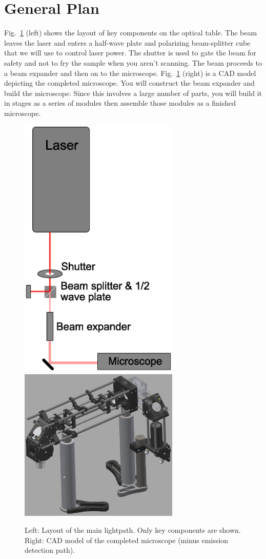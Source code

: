 \documentclass[a4paper]{report}
\begin{document}
\section{General Plan}
Fig.~\ref{fig:layout} (left) shows the layout of key components on the optical table. 
The beam leaves the laser and enters a half-wave plate and polarizing beam-splitter cube that we will use to control laser power. 
The shutter is used to gate the beam for safety and not to fry the sample when you aren't scanning.
The beam proceeds to a beam expander and then on to the microscope. 
Fig.~\ref{fig:layout} (right) is a CAD model depicting the completed microscope. 
You will construct the beam expander and build the microscope. 
Since this involves a large number of parts, you will build it in stages as a series of modules then assemble those modules as a finished microscope. 
\begin{figure}[h]
\center
\includegraphics[width=3in]{2p_table_layout.eps}
\includegraphics[width=3in]{completed_2p.eps}
\caption{Left: Layout of the main lightpath. Only key components are shown. Right: CAD model of the completed microscope (minus emission detection path).}
\label{fig:layout}
\end{figure}
\end{document}
